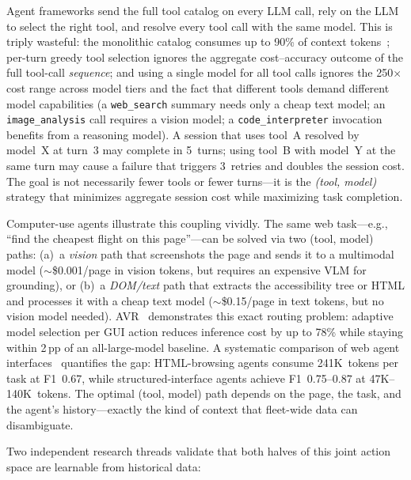 \begin{opportunity}
\label{opp:tool-pruning}
Agent frameworks send the full tool catalog on every LLM call,
rely on the LLM to select the right tool, and resolve every tool
call with the same model.  This is triply wasteful: the monolithic
catalog consumes up to 90\% of context tokens~\cite{itr2026};
per-turn greedy tool selection ignores the aggregate cost--accuracy
outcome of the full tool-call \emph{sequence}; and using a single
model for all tool calls ignores the 250$\times$ cost range across
model tiers and the fact that different tools demand different model
capabilities (a \texttt{web\_search} summary needs only a cheap
text model; an \texttt{image\_analysis} call requires a vision
model; a \texttt{code\_interpreter} invocation benefits from a
reasoning model).  A session that uses tool~A resolved by model~X
at turn~3 may complete in 5~turns; using tool~B with model~Y at the
same turn may cause a failure that triggers 3~retries and doubles
the session cost.  The goal is not necessarily fewer tools or fewer
turns---it is the \emph{(tool, model)} strategy that minimizes
aggregate session cost while maximizing task completion.

Computer-use agents illustrate this coupling vividly.  The same
web task---e.g., ``find the cheapest flight on this page''---can be
solved via two (tool, model) paths: (a)~a \emph{vision} path that
screenshots the page and sends it to a multimodal model
($\sim$\$0.001/page in vision tokens, but requires an expensive VLM
for grounding), or (b)~a \emph{DOM/text} path that extracts the
accessibility tree or HTML and processes it with a cheap text model
($\sim$\$0.15/page in text tokens, but no vision model needed).
AVR~\cite{avr2026} demonstrates this exact routing problem:
adaptive model selection per GUI action reduces inference cost by up
to 78\% while staying within 2\,pp of an all-large-model baseline.
A systematic comparison of web agent interfaces~\cite{webinterface2025}
quantifies the gap: HTML-browsing agents consume 241K~tokens per
task at F1~0.67, while structured-interface agents achieve
F1~0.75--0.87 at 47K--140K~tokens.  The optimal (tool, model) path
depends on the page, the task, and the agent's history---exactly the
kind of context that fleet-wide data can disambiguate.

Two independent research threads validate that both halves of this
joint action space are learnable from historical data:


\end{opportunity}
